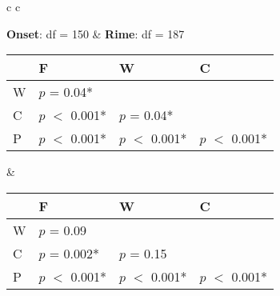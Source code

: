 \begin{figure}[h]
  \begin{center}
    \begin{tabular}{ c c}

      \textbf{Onset}: df = 150 & \textbf{Rime}: df = 187\\




      {
      \small

      \begin{tabular}{| l | l |  l | l |}
        \hline
        & F              & W           & C \\
        \hline
        W & $p$ = 0.04*  &             &\\
        \hline
        C & $p$ $<$ 0.001* &  $p$ = 0.04* & \\
        \hline
        P & $p$ $<$ 0.001* &  $p$ $<$ 0.001* &  $p$ $<$ 0.001* \\
        \hline
      \end{tabular}
      } &




          {
          \small
          \begin{tabular}{| l | l |  l | l |}
            \hline
            & F               & W           & C \\
            \hline
            W &  $p$ = 0.09 &             &\\
            \hline
            C &  $p$ = 0.002* &  $p$ = 0.15 &\\
            \hline
            P &  $p$ $<$ 0.001* &  $p$ $<$ 0.001* &  $p$ $<$ 0.001*\\
            \hline
          \end{tabular}
      }\\


\end{tabular}
\end{center}
\end{figure}
